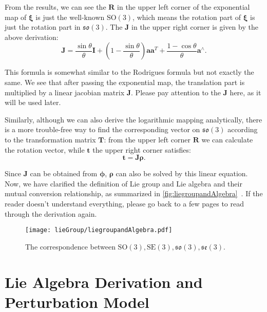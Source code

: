 From the results, we can see the $\mathbf{R}$ in the upper left corner of the exponential map of $\boldsymbol{\xi}$ is just the well-known $\mathrm{SO}(3)$, which means the rotation part of $\boldsymbol{\xi}$ is just the rotation part in $\mathfrak{so}(3)$. The $\mathbf{J}$ in the upper right corner is given by the above derivation:
\begin{equation}
\label{eq:lieAlgebraJacobian}
\mathbf{J} = \frac{{\sin \theta }}{\theta } \mathbf{I} + \left( {1 - \frac{{\sin \theta }}{\theta }} \right) \mathbf{a} { \mathbf{a}^T} + \frac{{1 - \cos \theta }}{\theta }{ \mathbf{a}^ \wedge }.
\end{equation}

This formula is somewhat similar to the Rodrigues formula but not exactly the same. We see that after passing the exponential map, the translation part is multiplied by a linear jacobian matrix $\mathbf{J}$. Please pay attention to the $\mathbf{J}$ here, as it will be used later.

Similarly, although we can also derive the logarithmic mapping analytically, there is a more trouble-free way to find the corresponding vector on $\mathfrak{so}(3)$ according to the transformation matrix $\mathbf{T}$: from the upper left corner $\mathbf{R}$ we can calculate the rotation vector, while $\mathbf{t}$ the upper right corner satisfies:
\begin{equation}
\mathbf{t} = \mathbf{J} \boldsymbol{\rho}.
\end{equation}

Since $\mathbf{J}$ can be obtained from $\boldsymbol{\phi}$, $\boldsymbol{\rho}$ can also be solved by this linear equation. Now, we have clarified the definition of Lie group and Lie algebra and their mutual conversion relationship, as summarized in \autoref{fig:liegroupandAlgebra}~. If the reader doesn't understand everything, please go back to a few pages to read through the derivation again.

\begin{figure}[!ht]
    \centering
    \texttt{[image: lieGroup/liegroupandAlgebra.pdf]}
    \caption{The correspondence between $\mathrm{SO}(3), \mathrm{SE}(3), \mathfrak{so}(3), \mathfrak{se}(3)$. }
    \label{fig:liegroupandAlgebra}
\end{figure}

\section{Lie Algebra Derivation and Perturbation Model}
